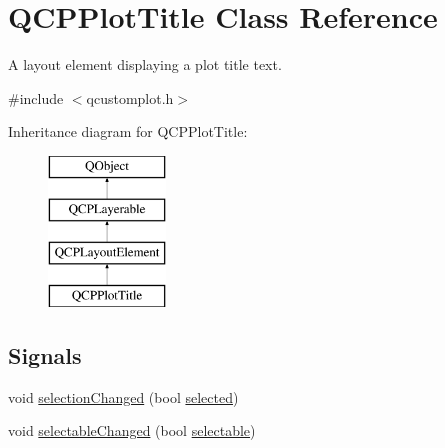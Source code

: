 \hypertarget{class_q_c_p_plot_title}{}\section{Q\+C\+P\+Plot\+Title Class Reference}
\label{class_q_c_p_plot_title}


A layout element displaying a plot title text.  




{\ttfamily \#include $<$qcustomplot.\+h$>$}

Inheritance diagram for Q\+C\+P\+Plot\+Title\+:\begin{figure}[H]
\begin{center}
\leavevmode
\includegraphics[height=4.000000cm]{class_q_c_p_plot_title}
\end{center}
\end{figure}
\subsection*{Signals}
\begin{DoxyCompactItemize}
\item 
void \hyperlink{class_q_c_p_plot_title_a3a01ede2da3b0b5eda33aa5274cc3523}{selection\+Changed} (bool \hyperlink{class_q_c_p_plot_title_a9771f3a4bca026484d7c8b5d953b5e82}{selected})
\item 
void \hyperlink{class_q_c_p_plot_title_a5eac3c17a4dbabb75250bc1210a83cfc}{selectable\+Changed} (bool \hyperlink{class_q_c_p_plot_title_a8d75c7cbcf2049c9512a3335d6f11416}{selectable})
\end{DoxyCompactItemize}
